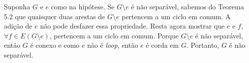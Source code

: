 
 Suponha $G$ e $e$ como na hipótese. Se $G\setminus e$ é não
separável, sabemos do Teorema 5.2 que quaisquer duas arestas de $G\setminus e$
pertencem a um ciclo em comum. A adição de $e$ não pode desfazer essa
propriedade. Resta agora mostrar que $e$ e $f$, $\forall f \in E(G\setminus
e)$, pertencem a um ciclo em comum.  Porque $G\setminus e$ é não separável,
então $G$ é conexo e como $e$ não é \emph{loop}, então $e$ é corda em $G$.
Portanto, $G$ é não separável.

